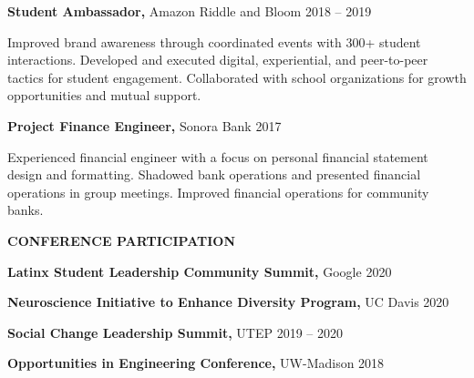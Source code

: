 \documentclass[11pt]{article}
\newcommand{\sectionheading}[1]{%
  \vspace{1.6ex}%
  {\large\bfseries\MakeUppercase{#1}}\par\vspace{0.6ex}%
}
\begin{document}
\textbf{Student Ambassador,} Amazon \textbar{} Riddle and Bloom 2018 -- 2019

Improved brand awareness through coordinated events with 300+ student interactions. Developed and executed digital, experiential, and peer-to-peer tactics for student engagement. Collaborated with school organizations for growth opportunities and mutual support.

\textbf{Project Finance Engineer,} Sonora Bank 2017

Experienced financial engineer with a focus on personal financial statement design and formatting. Shadowed bank operations and presented financial operations in group meetings. Improved financial operations for community banks.

\sectionheading{CONFERENCE PARTICIPATION}

\textbf{Latinx Student Leadership Community Summit,} Google 2020

\textbf{Neuroscience Initiative to Enhance Diversity Program,} UC Davis 2020

\textbf{Social Change Leadership Summit,} UTEP 2019 -- 2020

\textbf{Opportunities in Engineering Conference,} UW-Madison 2018
\end{document}
